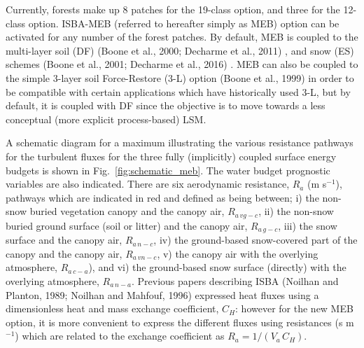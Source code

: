 Currently, forests make
up 8 patches for the 19-class option, and three for the 12-class
option.
ISBA-MEB (referred to hereafter
simply as MEB) 
option can be
activated for any number of the forest patches.
%
By default, MEB is coupled to the multi-layer soil (DF)
(Boone et al., 2000; Decharme et al., 2011)
\nocite{Boone2000,Decharme2011}, 
and snow (ES) schemes 
(Boone et al., 2001; Decharme et al., 2016)
\nocite{Boone2001,Decharme16}.
MEB can also be
coupled to the simple 3-layer soil 
Force-Restore (3-L) option 
(Boone et al., 1999)
\nocite{Boone1999} 
in order to be compatible
with certain applications which have historically used 3-L, but by
default, it is
coupled with DF since the objective is to move towards a less
conceptual (more explicit process-based) LSM.

A schematic diagram for a maximum illustrating
the various resistance pathways for the turbulent fluxes for 
the three fully (implicitly) coupled surface energy budgets
is shown in Fig.~\ref{fig:schematic_meb}. The water budget
prognostic variables are also indicated.
%
There are six aerodynamic resistance, $R_{a}$ (m s$^{-1}$), pathways which
are indicated in red and defined as being between; 
i) the non-snow buried vegetation canopy and the canopy air, 
$R_{a\,vg-c}$, 
ii) the non-snow buried ground surface (soil or litter) and the canopy air,
$R_{a\,g-c}$,
iii) the snow surface and the canopy
air, $R_{a\,n-c}$, 
iv) the ground-based snow-covered part of the canopy 
and the canopy air, $R_{a\,vn-c}$,
v) the canopy air with the overlying atmosphere, $R_{a\,c-a}$), 
and vi) the ground-based snow surface (directly) with 
the overlying atmosphere, $R_{a\,n-a}$.
%
Previous papers describing ISBA 
(Noilhan and Planton, 1989; Noilhan and Mahfouf, 1996)
\nocite{Noilhan1989,Noilhan1996}
expressed heat fluxes using a dimensionless heat and mass exchange coefficient,
$C_H$:
however for the new MEB option, it is more convenient to express the different
fluxes using resistances (s m$^{-1}$)
which are related to the exchange coefficient as
$R_a=1/\left(V_a\,C_H\right)$.

